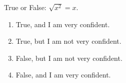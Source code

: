 \bigskip

\item  True or False:  $\sqrt{x^2}=x$.

\begin{enumerate}
\item True, and I am very confident.
\item True, but I am not very confident.
\item False, but I am not very confident.
\item False, and I am very confident.
\end{enumerate}


